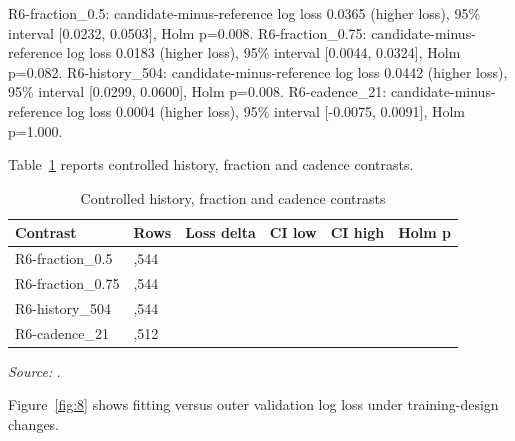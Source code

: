 \documentclass[11pt,a4paper]{article}
\begin{document}


R6-fraction\_0.5: candidate-minus-reference log loss 0.0365 (higher loss), 95\% interval [0.0232, 0.0503], Holm p=0.008. R6-fraction\_0.75: candidate-minus-reference log loss 0.0183 (higher loss), 95\% interval [0.0044, 0.0324], Holm p=0.082. R6-history\_504: candidate-minus-reference log loss 0.0442 (higher loss), 95\% interval [0.0299, 0.0600], Holm p=0.008. R6-cadence\_21: candidate-minus-reference log loss 0.0004 (higher loss), 95\% interval [-0.0075, 0.0091], Holm p=1.000.

\noindent Table~\ref{tab:10} reports controlled history, fraction and cadence contrasts.

\begin{table}[!htbp]\centering\footnotesize\setlength{\tabcolsep}{3pt}\renewcommand{\arraystretch}{1.14}
\caption{Controlled history, fraction and cadence contrasts}\label{tab:10}
\begin{tabular}{@{}>{\raggedright\arraybackslash}p{}>{\raggedleft\arraybackslash}p{}>{\raggedleft\arraybackslash}p{}>{\raggedleft\arraybackslash}p{}>{\raggedleft\arraybackslash}p{}>{\raggedleft\arraybackslash}p{}@{}}
\toprule
\textbf{Contrast} & \textbf{Rows} & \textbf{Loss delta} & \textbf{CI low} & \textbf{CI high} & \textbf{Holm p} \\
\midrule
R6-fraction\_\allowbreak{}0.5 & 5,544 & 0.0365 & 0.0232 & 0.0503 & 0.008 \\
R6-fraction\_\allowbreak{}0.75 & 5,544 & 0.0183 & 0.0044 & 0.0324 & 0.082 \\
R6-history\_\allowbreak{}504 & 5,544 & 0.0442 & 0.0299 & 0.0600 & 0.008 \\
R6-cadence\_\allowbreak{}21 & 1,512 & 0.0004 & -0.0075 & 0.0091 & 1.000 \\
\bottomrule\end{tabular}\par\smallskip
\raggedright\textit{Source:} .
\end{table}



\noindent Figure~\ref{fig:8} shows fitting versus outer validation log loss under training-design changes.
\end{document}
